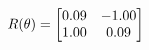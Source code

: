 \documentclass[preview]{standalone}
\begin{document}
\begin{align*}
\special{dvisvgm:raw <g id='unique000'>}R(\theta) = \begin{bmatrix}0.09 & -1.00\\1.00 & 0.09\end{bmatrix}\special{dvisvgm:raw </g>}
\end{align*}
\end{document}
